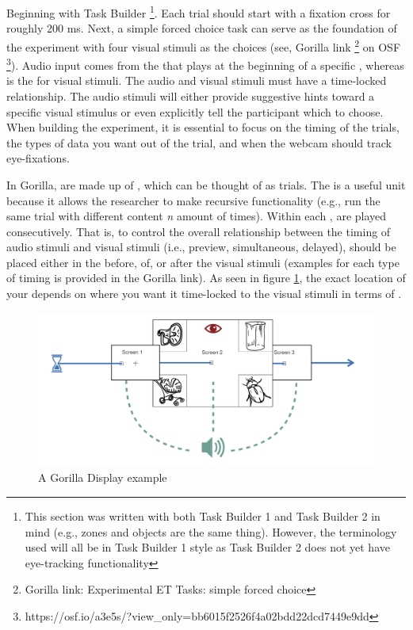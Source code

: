 Beginning with Task Builder \footnote{This section was written with both Task Builder 1 and Task Builder 2 in mind (e.g., zones and objects are the same thing). However, the terminology used will all be in Task Builder 1 style as Task Builder 2 does not yet have eye-tracking functionality}. Each trial should start with a fixation cross for roughly 200 ms. Next, a simple forced choice task can serve as the foundation of the experiment with four visual stimuli as the choices (see, Gorilla link \footnote{Gorilla link: Experimental ET Tasks: simple forced choice} on OSF \footnote{https://osf.io/a3e5s/?view\_only=bb6015f2526f4a02bdd22dcd7449e9dd}). Audio input comes from the   that plays at the beginning of a specific , whereas  is the  for visual stimuli. The audio and visual stimuli must have a time-locked relationship. The audio stimuli will either provide suggestive hints toward a specific visual stimulus or even explicitly tell the participant which to choose. When building the experiment, it is essential to focus on the timing of the trials, the types of data you want out of the trial, and when the webcam should track eye-fixations. 

In Gorilla,  are made up of , which can be thought of as trials. The  is a useful unit because it allows the researcher to make recursive functionality (e.g., run the same trial with different content \textit{n} amount of times). Within each ,   are played consecutively. That is, to control the overall relationship between the timing of audio stimuli and visual stimuli (i.e., preview, simultaneous, delayed),  should be placed either in the  before, of, or after the visual stimuli (examples for each type of timing is provided in the Gorilla link). As seen in figure \ref{fig:Gorilla_work_flow}, the exact location of your  depends on where you want it time-locked to the visual stimuli in terms of . 

\begin{figure}[h]
    \centering
    \includegraphics[scale=.5]{figures/Gorilla_work_flow.png}
    \caption{A Gorilla Display example}
    \label{fig:Gorilla_work_flow}
\end{figure}

